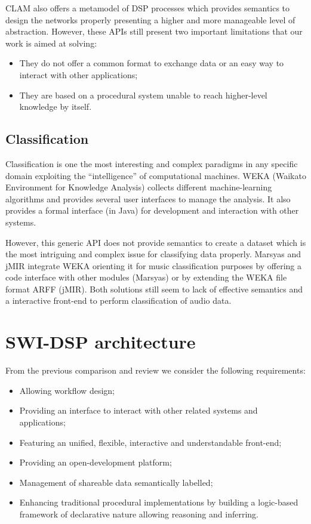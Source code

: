 \documentclass[runningheads]{llncs}
\begin{document}
CLAM also offers a metamodel of DSP processes which provides semantics to design the networks properly presenting a higher and more manageable level of abstraction. However, these APIs still present two important limitations that our work is aimed at solving:

\begin{itemize}
 \item They do not offer a common format to exchange data or an easy way to interact with other applications;
 \item They are based on a procedural system unable to reach higher-level knowledge by itself.
\end{itemize}

\subsection{Classification}\label{subsec:classif}

Classification is one the most interesting and complex paradigms in any specific domain exploiting the ``intelligence'' of computational machines. WEKA (Waikato Environment for Knowledge Analysis) \cite{weka} collects different machine-learning algorithms and provides several user interfaces to manage the analysis. It also provides a formal interface (in Java) for development and interaction with other systems.

However, this generic API does not provide semantics to create a dataset which is the most intriguing and complex issue for classifying data properly. Marsyas and jMIR integrate WEKA orienting it for music classification purposes by offering a code interface with other modules (Marsyas) or by extending the WEKA file format ARFF (jMIR). Both solutions still seem to lack of effective semantics and a interactive front-end to perform classification of audio data.

\section{SWI-DSP architecture}\label{sec:architecture}

From the previous comparison and review we consider the following requirements:

\begin{itemize}
 \item Allowing workflow design;
 \item Providing an interface to interact with other related systems and applications;
 \item Featuring an unified, flexible, interactive and understandable front-end;
 \item Providing an open-development platform;
 \item Management of shareable data semantically labelled;
 \item Enhancing traditional procedural implementations by building a logic-based framework of declarative nature allowing reasoning and inferring.
\end{itemize}
\end{document}
